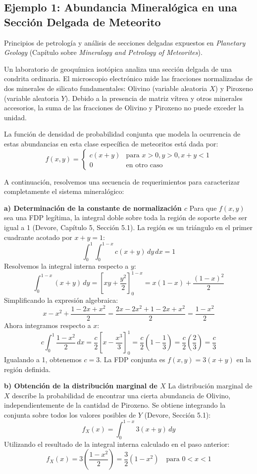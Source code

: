 \subsection{Ejemplo 1: Abundancia Mineralógica en una Sección Delgada de Meteorito}

Principios de petrología y análisis de secciones delgadas expuestos en \textit{Planetary Geology} (Capítulo sobre \textit{Mineralogy and Petrology of Meteorites}). 

Un laboratorio de geoquímica isotópica analiza una sección delgada de una condrita ordinaria. El microscopio electrónico mide las fracciones normalizadas de dos minerales de silicato fundamentales: Olivino (variable aleatoria $X$) y Piroxeno (variable aleatoria $Y$). Debido a la presencia de matriz vítrea y otros minerales accesorios, la suma de las fracciones de Olivino y Piroxeno no puede exceder la unidad. 

La función de densidad de probabilidad conjunta que modela la ocurrencia de estas abundancias en esta clase específica de meteoritos está dada por:
$$
f(x,y) = 
\begin{cases} 
c(x + y) & \text{para } x > 0, y > 0, x + y < 1 \\
0 & \text{en otro caso}
\end{cases}
$$

A continuación, resolvemos una secuencia de requerimientos para caracterizar completamente el sistema mineralógico:

\textbf{a) Determinación de la constante de normalización $c$}
Para que $f(x,y)$ sea una FDP legítima, la integral doble sobre toda la región de soporte debe ser igual a 1 (Devore, Capítulo 5, Sección 5.1). La región es un triángulo en el primer cuadrante acotado por $x+y=1$:
$$ \int_{0}^{1} \int_{0}^{1-x} c(x + y) \, dy \, dx = 1 $$
Resolvemos la integral interna respecto a $y$:
$$ \int_{0}^{1-x} (x + y) \, dy = \left[ xy + \frac{y^2}{2} \right]_{0}^{1-x} = x(1-x) + \frac{(1-x)^2}{2} $$
Simplificando la expresión algebraica:
$$ x - x^2 + \frac{1 - 2x + x^2}{2} = \frac{2x - 2x^2 + 1 - 2x + x^2}{2} = \frac{1 - x^2}{2} $$
Ahora integramos respecto a $x$:
$$ c \int_{0}^{1} \frac{1 - x^2}{2} \, dx = \frac{c}{2} \left[ x - \frac{x^3}{3} \right]_{0}^{1} = \frac{c}{2} \left( 1 - \frac{1}{3} \right) = \frac{c}{2} \left( \frac{2}{3} \right) = \frac{c}{3} $$
Igualando a 1, obtenemos $c = 3$. La FDP conjunta es $f(x,y) = 3(x+y)$ en la región definida.

\textbf{b) Obtención de la distribución marginal de $X$}
La distribución marginal de $X$ describe la probabilidad de encontrar una cierta abundancia de Olivino, independientemente de la cantidad de Piroxeno. Se obtiene integrando la conjunta sobre todos los valores posibles de $Y$ (Devore, Sección 5.1):
$$ f_X(x) = \int_{0}^{1-x} 3(x + y) \, dy $$
Utilizando el resultado de la integral interna calculado en el paso anterior:
$$ f_X(x) = 3 \left( \frac{1 - x^2}{2} \right) = \frac{3}{2}(1 - x^2) \quad \text{para } 0 < x < 1 $$

